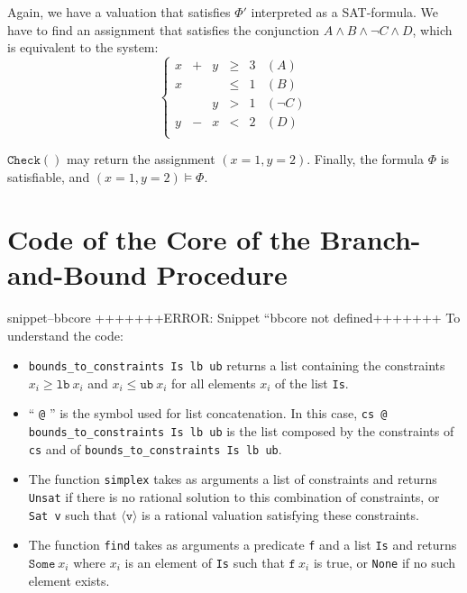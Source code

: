 \documentclass{article}
\newcommand{\icheck}{\mathtt{Check}()}
\newcommand{\Snippet}[1]{%
  \ifcsname snippet--#1\endcsname{\csname snippet--#1\endcsname}%
  \else+++++++ERROR: Snippet ``#1 not defined+++++++ \fi}
\begin{document}
Again, we have a valuation that satisfies $\Phi'$ interpreted as a
SAT-formula. We have to find an assignment that satisfies the conjunction
$A \wedge B \wedge \neg C \wedge D$, which is equivalent to the system:
\begin{displaymath}
  \left\{
  \begin{array}{cccccc}
    x  & + & y & \geqslant & 3 & (A) \\
    x  &   &   & \leqslant & 1 & (B) \\
       &   & y & >         & 1 & (\neg C) \\
    y  & - & x & <         & 2 & (D) \\
  \end{array}
  \right.
\end{displaymath}

$\icheck$ may return the assignment $(x=1, y=2)$. Finally, the formula $\Phi$
is satisfiable, and $(x=1, y=2) \vDash \Phi$.

\section{Code of the Core of the Branch-and-Bound Procedure}
\label{bbcode}

\Snippet{bbcore}
To understand the code:
\begin{itemize}
  \item \texttt{bounds\_to\_constraints Is lb ub} returns a list containing the
    constraints $x_i \geqslant \mathtt{lb}~x_i$ and
    $x_i \leqslant \mathtt{ub}~x_i$ for all elements $x_i$ of the list
    \texttt{Is}.
  \item `` \texttt{@} '' is the symbol used for list concatenation. In this case,
    \linebreak \texttt{cs @ bounds\_to\_constraints Is lb ub} is the list
    composed by the constraints of \texttt{cs} and of
    \texttt{bounds\_to\_constraints~Is~lb~ub}.
  \item The function \texttt{simplex} takes as arguments a list of
    constraints and returns \texttt{Unsat} if there is no rational solution to
    this combination of constraints, or \texttt{Sat v} such that
    $\langle \mathtt{v} \rangle$ is a rational valuation satisfying these
    constraints.
  \item The function \texttt{find} takes as arguments a predicate \texttt{f}
    and a list \texttt{Is} and returns $\mathtt{Some}~x_i$ where $x_i$ is
    an element of \texttt{Is} such that $\mathtt{f}~x_i$ is true, or
    \texttt{None} if no such element exists.
\end{itemize}
\end{document}
